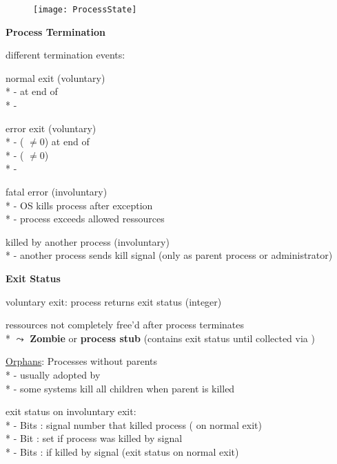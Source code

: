 \begin{figure}[H]\centering\label{ProcessState}\texttt{[image: ProcessState]}\end{figure}

\textbf{Process Termination}
\begin{items}
  \item different termination events: 
  \begin{enumeration}
    \item normal exit (voluntary) \\*
      -  at end of  \\*
      - 
    \item error exit (voluntary) \\*
      -  ( \( \neq 0 \)) at end of  \\*
      -  ( \( \neq 0 \)) \\*
      - 
    \item fatal error (involuntary) \\*
      - OS kills process after exception \\*
      - process exceeds allowed ressources
    \item killed by another process (involuntary) \\*
      - another process sends kill signal (only as parent process or administrator)
  \end{enumeration}
\end{items}

\textbf{Exit Status}
\begin{items}
  \item voluntary exit: process returns exit status (integer)
  \item ressources not completely free'd after process terminates \\*
    \( \leadsto \) \textbf{Zombie} or \textbf{process stub} (contains exit status until collected via )
  \item \underline{Orphans}: Processes without parents \\*
    - usually adopted by  \\*
    - some systems kill all children when parent is killed
  \item exit status on involuntary exit: \\*
    - Bits : signal number that killed process ( on normal exit) \\*
    - Bit : set if process was killed by signal \\*
    - Bits :  if killed by signal (exit status on normal exit)
\end{items}
